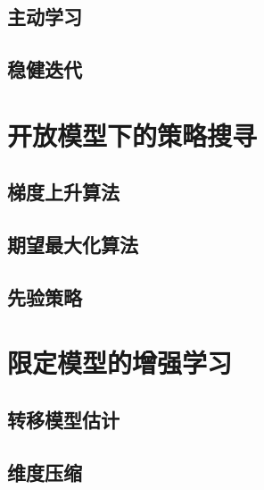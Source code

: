 \section{主动学习}
\section{稳健迭代}

\chapter{开放模型下的策略搜寻} 
\section{梯度上升算法}
\section{期望最大化算法}
\section{先验策略}

\chapter{限定模型的增强学习} 
\section{转移模型估计}
\section{维度压缩}

